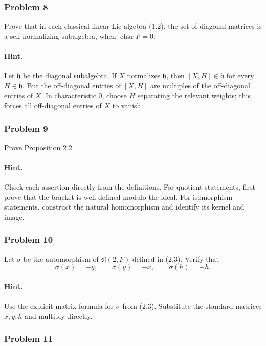 \documentclass[12pt, a4paper]{article}
\begin{document}
\subsubsection{Problem 8}

Prove that in each classical linear Lie algebra (1.2), the set of diagonal
matrices is a self-normalizing subalgebra, when \(\operatorname{char} F=0\).

\paragraph{Hint.}
Let \(\mathfrak{h}\) be the diagonal subalgebra. If \(X\) normalizes
\(\mathfrak{h}\), then \([X,H]\in \mathfrak{h}\) for every \(H\in\mathfrak{h}\).
But the off-diagonal entries of \([X,H]\) are multiples of the off-diagonal
entries of \(X\). In characteristic \(0\), choose \(H\) separating the relevant
weights; this forces all off-diagonal entries of \(X\) to vanish.

\subsubsection{Problem 9}

Prove Proposition 2.2.

\paragraph{Hint.}
Check each assertion directly from the definitions. For quotient statements,
first prove that the bracket is well-defined modulo the ideal. For isomorphism
statements, construct the natural homomorphism and identify its kernel and
image.

\subsubsection{Problem 10}

Let \(\sigma\) be the automorphism of \(\mathfrak{sl}(2,F)\) defined in (2.3).
Verify that
\[
\sigma(x)=-y, \qquad \sigma(y)=-x, \qquad \sigma(h)=-h .
\]

\paragraph{Hint.}
Use the explicit matrix formula for \(\sigma\) from (2.3). Substitute the
standard matrices \(x,y,h\) and multiply directly.

\subsubsection{Problem 11}
\end{document}
